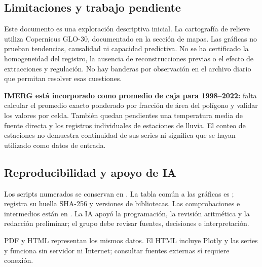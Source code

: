 \subsection{Limitaciones y trabajo pendiente}
Este documento es una exploración descriptiva inicial. La cartografía de relieve utiliza Copernicus GLO-30, documentado en la sección de mapas. Las gráficas no prueban
tendencias, causalidad ni capacidad predictiva. No se ha certificado la
homogeneidad del registro, la ausencia de reconstrucciones previas o el efecto de
extracciones y regulación. No hay banderas por observación en el archivo diario
que permitan resolver esas cuestiones.

\textbf{IMERG está incorporado como promedio de caja para 1998--2022:} falta
calcular el promedio exacto ponderado por fracción de área del polígono y validar
los valores por celda. También quedan pendientes una temperatura media de fuente
directa y los registros individuales de estaciones de lluvia. El conteo de estaciones
no demuestra continuidad de sus series ni significa que se hayan utilizado como datos de entrada.

\subsection{Reproducibilidad y apoyo de IA}
Los scripts numerados se conservan en .
La tabla común a las gráficas es ;
 registra su huella SHA-256 y versiones de bibliotecas.
Las comprobaciones e intermedios están en .
La IA apoyó la programación, la revisión aritmética y la redacción preliminar;
el grupo debe revisar fuentes, decisiones e interpretación.

PDF y HTML representan los mismos datos. El HTML incluye Plotly y las series y
funciona sin servidor ni Internet; consultar fuentes externas sí requiere conexión.
